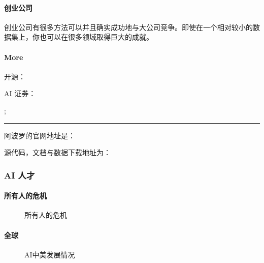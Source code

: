 \documentclass[letterpaper,11pt,english]{sphinxmanual}
\begin{document}
\paragraph{创业公司}
\label{\detokenize{chapter_project/AI_company:id18}}
创业公司有很多方法可以并且确实成功地与大公司竞争。即使在一个相对较小的数据集上，你也可以在很多领域取得巨大的成就。


\paragraph{More}
\label{\detokenize{chapter_project/AI_company:more}}
 
开源： 

AI 证券：

;


\bigskip\hrule\bigskip


阿波罗的官网地址是： 

源代码，文档与数据下载地址为： 


\subsubsection{AI 人才}
\label{\detokenize{chapter_project/AI_talents:ai}}\label{\detokenize{chapter_project/AI_talents::doc}}

\paragraph{所有人的危机}
\label{\detokenize{chapter_project/AI_talents:id1}}
\begin{figure}[H]
\centering
\capstart

\noindent{}
\caption{所有人的危机\sphinxfootnotemark[668]}\label{\detokenize{chapter_project/AI_talents:id17}}\end{figure}
%
\begin{footnotetext}[668]\sphinxAtStartFootnote
{}
%
\end{footnotetext}\ignorespaces 

\paragraph{全球}
\label{\detokenize{chapter_project/AI_talents:id2}}
\begin{figure}[H]
\centering
\capstart

\noindent{}
\caption{AI中美发展情况}\label{\detokenize{chapter_project/AI_talents:id18}}\end{figure}
\end{document}
